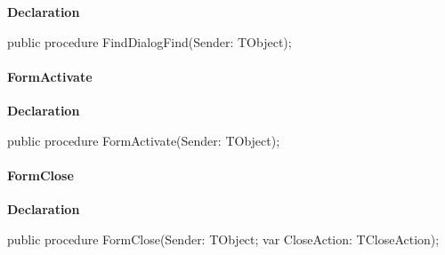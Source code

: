 \documentclass{report}
\newif\ifpdf
\begin{document}
\label{editor.TFrmEditor-FindDialogFind}
\begin{list}{}{
\setlength{\itemindent}{0cm}
\setlength{\listparindent}{0cm}
\setlength{\leftmargin}{\evensidemargin}
\addtolength{\leftmargin}{\tmplength}
\settowidth{\labelsep}{X}
\addtolength{\leftmargin}{\labelsep}
\setlength{\labelwidth}{\tmplength}
}
\item[\textbf{Declaration}\hfill]
\ifpdf
\begin{flushleft}
\fi
\begin{ttfamily}
public procedure FindDialogFind(Sender: TObject);\end{ttfamily}

\ifpdf
\end{flushleft}
\fi

\end{list}
\paragraph*{FormActivate}\hspace*{\fill}

\label{editor.TFrmEditor-FormActivate}
\begin{list}{}{
\setlength{\itemindent}{0cm}
\setlength{\listparindent}{0cm}
\setlength{\leftmargin}{\evensidemargin}
\addtolength{\leftmargin}{\tmplength}
\settowidth{\labelsep}{X}
\addtolength{\leftmargin}{\labelsep}
\setlength{\labelwidth}{\tmplength}
}
\item[\textbf{Declaration}\hfill]
\ifpdf
\begin{flushleft}
\fi
\begin{ttfamily}
public procedure FormActivate(Sender: TObject);\end{ttfamily}

\ifpdf
\end{flushleft}
\fi

\end{list}
\paragraph*{FormClose}\hspace*{\fill}

\label{editor.TFrmEditor-FormClose}
\begin{list}{}{
\setlength{\itemindent}{0cm}
\setlength{\listparindent}{0cm}
\setlength{\leftmargin}{\evensidemargin}
\addtolength{\leftmargin}{\tmplength}
\settowidth{\labelsep}{X}
\addtolength{\leftmargin}{\labelsep}
\setlength{\labelwidth}{\tmplength}
}
\item[\textbf{Declaration}\hfill]
\ifpdf
\begin{flushleft}
\fi
\begin{ttfamily}
public procedure FormClose(Sender: TObject; var CloseAction: TCloseAction);\end{ttfamily}

\ifpdf
\end{flushleft}
\fi

\end{list}
\end{document}
